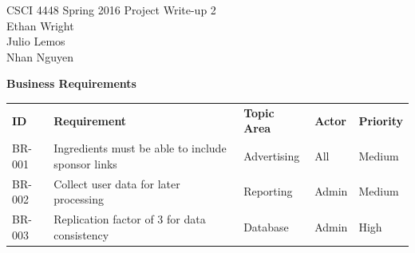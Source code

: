\documentclass[12pt]{article}
\begin{document}
CSCI 4448 Spring 2016 \hfill Project Write-up 2\\
Ethan Wright \\
Julio Lemos \\
Nhan Nguyen \\

\hrulefill
\begin{center}
  \textbf{Business Requirements} \\
\begin{tabular}{ l  l  l  l  l  }
  \textbf{ID}  & \textbf{Requirement} & \textbf{Topic Area} & \textbf{Actor} & \textbf{Priority} \\  \rowcolor[gray]{.95} \hline
  BR-001 & Ingredients must be able to include sponsor links & Advertising & All & Medium \\  
  BR-002 & Collect user data for later processing & Reporting & Admin & Medium \\  \rowcolor[gray]{.95}
  BR-003 & Replication factor of 3 for data consistency & Database & Admin & High \\ 

\end{tabular}
\\
  \vspace{1cm}



\end{center}
\end{document}
